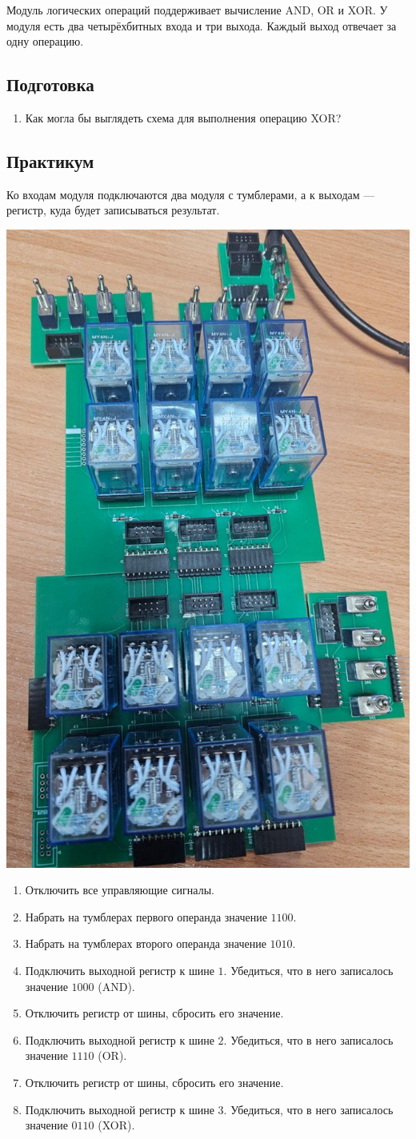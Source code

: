 Модуль логических операций поддерживает вычисление AND, OR и XOR.
У модуля есть два четырёхбитных входа и три выхода.
Каждый выход отвечает за одну операцию.

\subsection{Подготовка}

\begin{enumerate}
    \item Как могла бы выглядеть схема для выполнения операцию XOR?
\end{enumerate}

\subsection{Практикум}

Ко входам модуля подключаются два модуля с тумблерами, а к выходам --- регистр,
куда будет записываться результат.


\includegraphics[width=0.5\columnwidth]{photo/logic.jpg}

\begin{enumerate}
    \item Отключить все управляющие сигналы.
    \item Набрать на тумблерах первого операнда значение $1100$.
    \item Набрать на тумблерах второго операнда значение $1010$.
    \item Подключить выходной регистр к шине $1$. Убедиться, что в него записалось значение $1000$ (AND).
    \item Отключить регистр от шины, сбросить его значение.
    \item Подключить выходной регистр к шине $2$. Убедиться, что в него записалось значение $1110$ (OR).
    \item Отключить регистр от шины, сбросить его значение.
    \item Подключить выходной регистр к шине $3$. Убедиться, что в него записалось значение $0110$ (XOR).
\end{enumerate}





